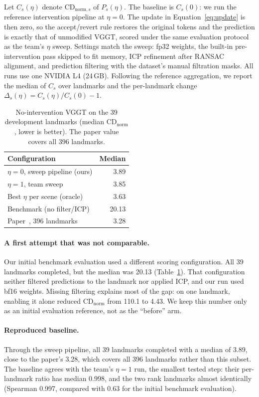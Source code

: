 \documentclass[sigconf,nonacm]{acmart}
\begin{document}
Let $C_s(\eta)$ denote $\mathrm{CD}_{\mathrm{norm},s}$ of $P_s(\eta)$. The baseline is $C_s(0)$: we run the reference intervention pipeline at $\eta=0$. The update in Equation~\ref{eq:update} is then zero, so the accept/revert rule restores the original tokens and the prediction is exactly that of unmodified VGGT, scored under the same evaluation protocol as the team's $\eta$ sweep. Settings match the sweep: fp32 weights, the built-in pre-intervention pass skipped to fit memory, ICP refinement after RANSAC alignment, and prediction filtering with the dataset's manual filtration masks. All runs use one NVIDIA L4 (24\,GB). Following the reference aggregation, we report the median of $C_s$ over landmarks and the per-landmark change $\Delta_s(\eta)=C_s(\eta)/C_s(0)-1$.

\begin{table}[htb]
\caption{No-intervention VGGT on the 39 development landmarks (median $\mathrm{CD}_{\mathrm{norm}}$, lower is better). The paper value covers all 396 landmarks.}
\label{tab:eric-base}
\centering
\begin{tabular}{lr}
\toprule
Configuration & Median\\
\midrule
$\eta=0$, sweep pipeline (ours) & 3.89\\
$\eta=1$, team sweep & 3.85\\
Best $\eta$ per scene (oracle) & 3.63\\
Benchmark (no filter/ICP) & 20.13\\
Paper~\cite{archworld}, 396 landmarks & 3.28\\
\bottomrule
\end{tabular}
\end{table}

\paragraph{A first attempt that was not comparable.} Our initial benchmark evaluation used a different scoring configuration. All 39 landmarks completed, but the median was 20.13 (Table~\ref{tab:eric-base}). That configuration neither filtered predictions to the landmark nor applied ICP, and our run used bf16 weights. Missing filtering explains most of the gap: on one landmark, enabling it alone reduced $\mathrm{CD}_{\mathrm{norm}}$ from 110.1 to 4.43. We keep this number only as an initial evaluation reference, not as the ``before'' arm.

\paragraph{Reproduced baseline.} Through the sweep pipeline, all 39 landmarks completed with a median of 3.89, close to the paper's 3.28, which covers all 396 landmarks rather than this subset. The baseline agrees with the team's $\eta=1$ run, the smallest tested step: their per-landmark ratio has median 0.998, and the two rank landmarks almost identically (Spearman 0.997, compared with 0.63 for the initial benchmark evaluation).
\end{document}
